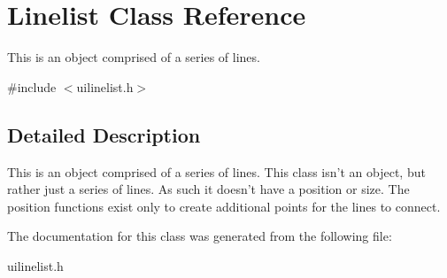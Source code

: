 \hypertarget{classLinelist}{
\section{Linelist Class Reference}
\label{d7/d63/classLinelist}
}


This is an object comprised of a series of lines.  




{\ttfamily \#include $<$uilinelist.h$>$}



\subsection{Detailed Description}
This is an object comprised of a series of lines. This class isn't an object, but rather just a series of lines. As such it doesn't have a position or size. The position functions exist only to create additional points for the lines to connect. 

The documentation for this class was generated from the following file:\begin{DoxyCompactItemize}
\item 
uilinelist.h\end{DoxyCompactItemize}
